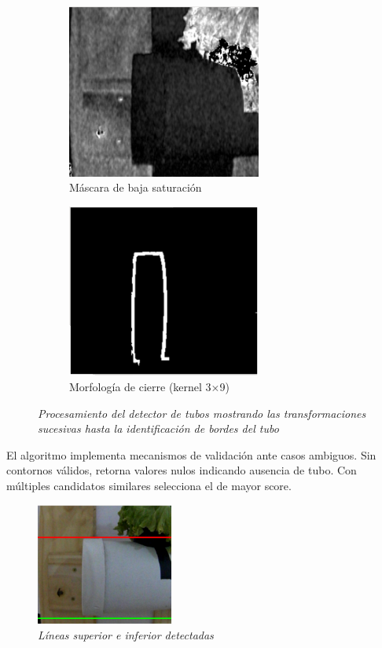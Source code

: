 \begin{figure}[H]
\begin{subfigure}[b]{0.48\textwidth}
    \centering
    \includegraphics[width=0.7\textwidth]{imagenes/detector_tubos_3_canal_s.png}
    \caption{Máscara de baja saturación}
\end{subfigure}
\hfill
\begin{subfigure}[b]{0.48\textwidth}
    \centering
    \includegraphics[width=0.7\textwidth]{imagenes/detector_tubos_5_morfologia.png}
    \caption{Morfología de cierre (kernel 3×9)}
\end{subfigure}

\vspace{0.3cm}

\caption{\textit{Procesamiento del detector de tubos mostrando las transformaciones sucesivas hasta la identificación de bordes del tubo}}
\label{fig:proceso_tubos}
\end{figure}

El algoritmo implementa mecanismos de validación ante casos ambiguos. Sin contornos válidos, retorna valores nulos indicando ausencia de tubo. Con múltiples candidatos similares selecciona el de mayor score. 

\begin{figure}[H]
    \centering
    \includegraphics[width=0.4\textwidth]{imagenes/detector_tubos_6_lineas.png}
    \caption{\textit{Líneas superior e inferior detectadas}}
    \label{fig:detector_tubos_lineas}
\end{figure}
